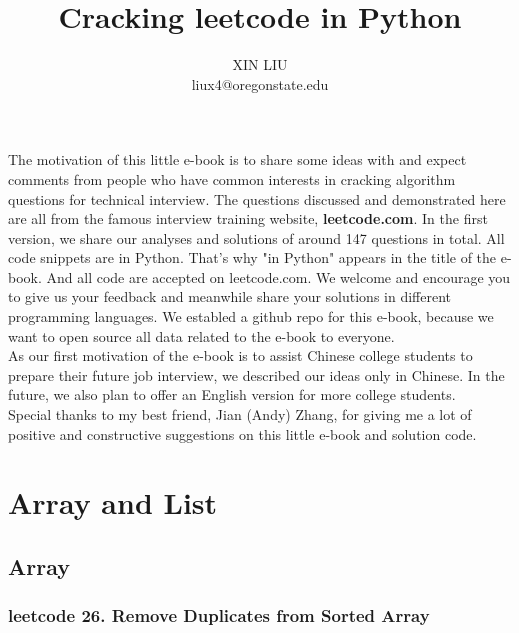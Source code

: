 \documentclass[a4paper,10pt]{article}
\title{Cracking leetcode in Python}
\author{XIN LIU \\ liux4@oregonstate.edu}
\begin{document}
\tableofcontents

\maketitle


\noindent The motivation of this little e-book is to share some ideas with and expect comments from people who have common interests in cracking algorithm questions for technical interview. The questions discussed and demonstrated here are all from the famous interview training website, \textbf{leetcode.com}. In the first version, we share our analyses and solutions of around 147 questions in total. All code snippets are in Python. That's why "in Python" appears in the title of the e-book. And all code are accepted on leetcode.com. We welcome and encourage you to give us your feedback and meanwhile share your solutions in different programming languages. We establed a github repo for this e-book, because we want to open source all data related to the e-book to everyone.\\

\noindent As our first motivation of the e-book is to assist Chinese college students to prepare their future job interview, we described our ideas only in Chinese. In the future, we also plan to offer an English version for more college students.\\

\noindent Special thanks to my best friend, Jian (Andy) Zhang, for giving me a lot of positive and constructive suggestions on this little e-book and solution code.\\


\medskip

\section{Array and List}

\subsection{Array}


\subsubsection{leetcode 26. Remove Duplicates from Sorted Array}
\end{document}

